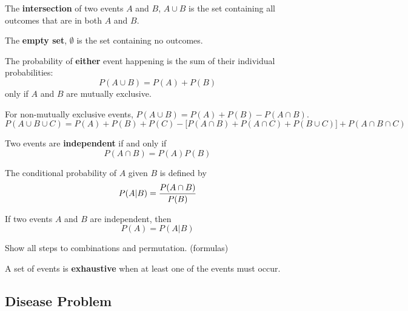 \documentclass[english, 12pt]{article}
\begin{document}
\begin{defn}
The \textbf{intersection} of two events $A$ and $B$, $ A \cup B$ is the set containing all outcomes that are in both $A$ and $B$.
\end{defn}

\begin{defn}
The \textbf{empty set}, $\emptyset$ is the set containing no outcomes.
\end{defn}

\begin{defn}
The probability of \textbf{either} event happening is the sum of their individual probabilities:
\[ P(A \cup B) = P(A) + P(B)\]
only if $A$ and $B$ are mutually exclusive.
\end{defn}

\begin{note}
For non-mutually exclusive events, $P(A \cup B) = P(A) + P(B) - P(A \cap B)$.
\[P(A \cup B \cup C) = P(A) + P(B) + P(C) - \lbrack P (A \cap B) + P(A \cap C) + P (B \cup C)\rbrack + P (A \cap B \cap C)\]
\end{note}

\begin{defn}
Two events are \textbf{independent} if and only if
\[ P(A \cap B) = P(A) P(B)\]
\end{defn}

\begin{defn}
The conditional probability of $A$ given $B$ is defined by
\[ P(A | B) = \frac{P(A \cap B)}{P(B)}\]
\end{defn}

\begin{note}
If two events $A$ and $B$ are independent, then
\[P(A) = P(A | B)\]
\end{note}

\begin{qte}
Show all steps to combinations and permutation. (formulas)
\end{qte}

\begin{defn}
A set of events is \textbf{exhaustive} when at least one of the events must occur.
\end{defn}

\subsection{Disease Problem}
\end{document}
